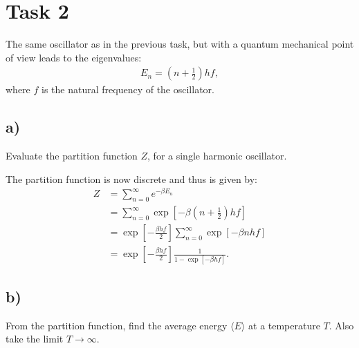 \documentclass[a4paper]{article}
\begin{document}
\section*{Task 2}
The same oscillator as in the previous task, but with a quantum mechanical point of view leads to the eigenvalues:
\begin{align*}
    E_n = \left(n + \frac{1}{2}\right)hf,
\end{align*}where $f$ is the natural frequency of the oscillator.

\subsection*{a)}
Evaluate the partition function $Z$, for a single harmonic oscillator.

\vspace*{0.5cm}\noindent
The partition function is now discrete and thus is given by:
\begin{align}
    Z &= \sum_{n=0}^\infty e^{-\beta E_n}\nonumber\\
    &= \sum_{n=0}^\infty \exp\left[-\beta\left(n + \frac{1}{2}\right)hf\right]\nonumber\\
    &=\exp\left[-\frac{\beta hf}{2}\right]\sum_{n=0}^\infty \exp\left[-\beta nhf\right]\nonumber\\
    &= \exp\left[-\frac{\beta hf}{2}\right]\frac{1}{1-\exp\left[-\beta hf\right]}.\label{eq: Parition function}
\end{align}
\subsection*{b)}
From the partition function, find the average energy $\langle E \rangle$ at a temperature $T$. Also take the limit $T\to\infty$.
\end{document}
